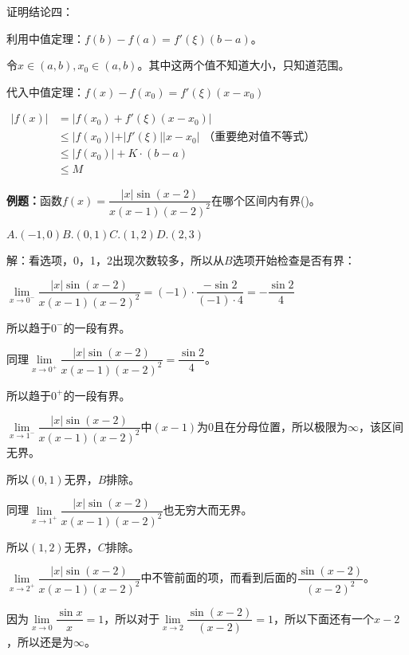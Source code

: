 \documentclass[UTF8, 12pt]{ctexart}
\begin{document}
        证明结论四：

        利用中值定理：$f(b)-f(a)=f'(\xi)(b-a)$。

        令$x\in(a,b),x_0\in(a,b)$。其中这两个值不知道大小，只知道范围。

        代入中值定理：$f(x)-f(x_0)=f'(\xi)(x-x_0)$

        $
        \begin{aligned}
            \vert f(x)\vert & =\vert f(x_0)+f'(\xi)(x-x_0)\vert \\
            & \leqslant\vert f(x_0)\vert+\vert f'(\xi)\vert\vert x-x_0\vert\text{ （重要绝对值不等式）} \\
            & \leqslant\vert f(x_0)\vert+K\cdot(b-a) \\
            & \leqslant M
        \end{aligned}
        $

        \textbf{例题：}函数$f(x)=\dfrac{\vert x\vert\sin(x-2)}{x(x-1)(x-2)^2}$在哪个区间内有界()。\medskip

        $A.(-1,0)$\qquad$B.(0,1)$\qquad$C.(1,2)$\qquad$D.(2,3)$\medskip

        解：看选项，0，1，2出现次数较多，所以从$B$选项开始检查是否有界：\medskip

        $\lim\limits_{x\to 0^-}\dfrac{\vert x\vert\sin(x-2)}{x(x-1)(x-2)^2}=(-1)\cdot\dfrac{-\sin 2}{(-1)\cdot 4}=-\dfrac{\sin 2}{4}$\medskip

        所以趋于$0^-$的一段有界。\medskip

        同理$\lim\limits_{x\to 0^+}\dfrac{\vert x\vert\sin(x-2)}{x(x-1)(x-2)^2}=\dfrac{\sin 2}{4}$。\medskip

        所以趋于$0^+$的一段有界。\medskip

        $\lim\limits_{x\to 1^-}\dfrac{\vert x\vert\sin(x-2)}{x(x-1)(x-2)^2}$中$(x-1)$为0且在分母位置，所以极限为$\infty$，该区间无界。\medskip

        所以$(0,1)$无界，$B$排除。\medskip

        同理$\lim\limits_{x\to 1^+}\dfrac{\vert x\vert\sin(x-2)}{x(x-1)(x-2)^2}$也无穷大而无界。\medskip

        所以$(1,2)$无界，$C$排除。\medskip

        $\lim\limits_{x\to 2^+}\dfrac{\vert x\vert\sin(x-2)}{x(x-1)(x-2)^2}$中不管前面的项，而看到后面的$\dfrac{\sin(x-2)}{(x-2)^2}$。\medskip

        因为$\lim\limits_{x\to 0}\dfrac{\sin x}{x}=1$，所以对于$\lim\limits_{x\to 2}\dfrac{\sin(x-2)}{(x-2)}=1$，所以下面还有一个$x-2$，所以还是为$\infty$。
\end{document}

